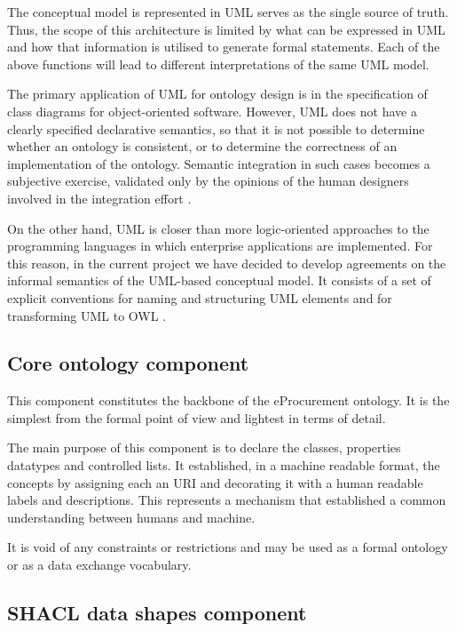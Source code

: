 	The conceptual model is represented in UML \citep{uml-userguide} serves as the single source of truth. Thus, the scope of this architecture is limited by what can be expressed in UML and how that information is utilised to generate formal statements. Each of the above functions will lead to different interpretations of the same UML model.
	
	The primary application of UML \citep{fowler2004} for ontology design is in the specification of class diagrams for object-oriented software. However, UML does not have a clearly specified declarative semantics, so that it is not possible to determine whether an ontology is consistent, or to determine the correctness of an implementation of the ontology. Semantic integration in such cases becomes a subjective exercise, validated only by the opinions of the human designers involved in the integration effort \cite{grunninger2003}. 
	
	On the other hand, UML is closer than more logic-oriented approaches to the programming languages in which enterprise applications are implemented. For this reason, in the current project we have decided to develop agreements on the informal semantics of the UML-based conceptual model. It consists of a set of explicit conventions for naming and structuring UML elements \cite{costetchi2020b} and for transforming UML to OWL \cite{costetchi2020c}.

	\subsection{Core ontology component}
	\label{sec:core-ontology}
	
	This component constitutes the backbone of the eProcurement ontology. It is the simplest from the formal point of view and lightest in terms of detail. 
	
	The main purpose of this component is to declare the classes, properties datatypes and controlled lists. It established, in a machine readable format, the concepts by assigning each an URI and decorating it with a human readable labels and descriptions. This represents a mechanism that established a common understanding between humans and machine. 
	
	It is void of any constraints or restrictions and may be used as a formal ontology or as a data exchange vocabulary.
	
	\subsection{SHACL data shapes component}
	\label{sec:shapes}
	
